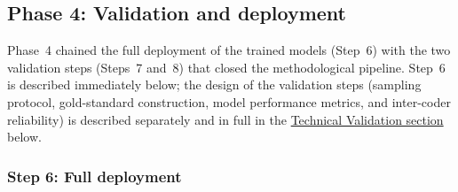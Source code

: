 \documentclass[12pt]{article}
\renewcommand\_{\texttt{\detokenize{_}\allowbreak}}
\begin{document}
\subsection{Phase 4: Validation and deployment}
\label{subsec:validation_and_deployment}

Phase~4 chained the full deployment of the trained models (Step~6) with the two validation steps (Steps~7 and~8) that closed the methodological pipeline. Step~6 is described immediately below; the design of the validation steps (sampling protocol, gold-standard construction, model performance metrics, and inter-coder reliability) is described separately and in full in the \hyperref[sec:technical_validation]{Technical Validation section} below.

\subsubsection{Step 6: Full deployment}
\end{document}
